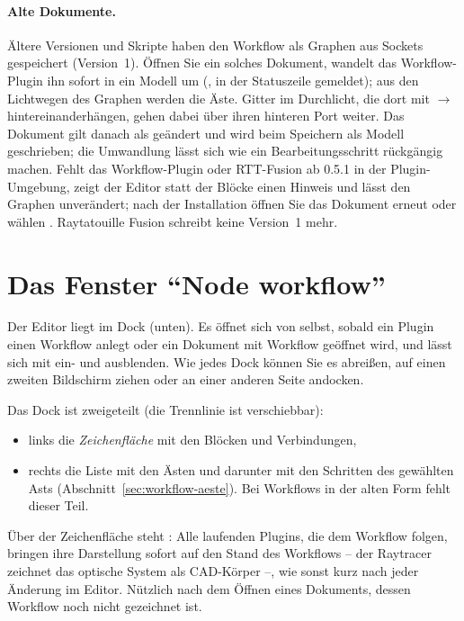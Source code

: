 \paragraph{Alte Dokumente.}\label{sec:workflow-alte-form} Ältere Versionen und Skripte
haben den Workflow als Graphen aus Sockets gespeichert (Version~1). Öffnen Sie ein solches
Dokument, wandelt das Workflow-Plugin ihn sofort in ein Modell um (, in der
Statuszeile gemeldet); aus den Lichtwegen des Graphen werden die Äste. Gitter im Durchlicht, die
dort mit  $\to$  hintereinanderhängen, gehen dabei über ihren hinteren Port
 weiter. Das Dokument gilt danach als geändert und wird beim Speichern als Modell
geschrieben; die Umwandlung lässt sich wie ein Bearbeitungsschritt rückgängig machen. Fehlt das
Workflow-Plugin oder RTT-Fusion ab 0.5.1 in der Plugin-Umgebung, zeigt der Editor statt der
Blöcke einen Hinweis und lässt den Graphen unverändert; nach der Installation öffnen Sie das
Dokument erneut oder wählen . Raytatouille Fusion schreibt keine
Version~1 mehr.

\section{Das Fenster \enquote{Node workflow}}\label{sec:workflow-fenster}

Der Editor liegt im Dock  (unten). Es öffnet sich von selbst, sobald ein
Plugin einen Workflow anlegt oder ein Dokument mit Workflow geöffnet wird, und lässt sich mit
 ein- und ausblenden. Wie jedes Dock können Sie es abreißen, auf einen
zweiten Bildschirm ziehen oder an einer anderen Seite andocken.

Das Dock ist zweigeteilt (die Trennlinie ist verschiebbar):

\begin{itemize}
  \item links die \emph{Zeichenfläche} mit den Blöcken und Verbindungen,
  \item rechts die Liste  mit den Ästen und darunter  mit den
        Schritten des gewählten Asts (Abschnitt~\ref{sec:workflow-aeste}). Bei Workflows in
        der alten Form fehlt dieser Teil.
\end{itemize}

Über der Zeichenfläche steht : Alle laufenden Plugins, die dem Workflow
folgen, bringen ihre Darstellung sofort auf den Stand des Workflows – der Raytracer zeichnet das
optische System als CAD-Körper –, wie sonst kurz nach jeder Änderung im Editor. Nützlich nach
dem Öffnen eines Dokuments, dessen Workflow noch nicht gezeichnet ist.

